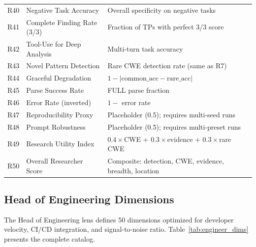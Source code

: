 \documentclass[10pt,twocolumn]{article}
\begin{document}
\begin{table}[t]
\begin{tabular}{@{}r l p{7.5cm}@{}}
R40 & Negative Task Accuracy              & Overall specificity on negative tasks \\
R41 & Complete Finding Rate (3/3)         & Fraction of TPs with perfect 3/3 score \\
R42 & Tool-Use for Deep Analysis          & Multi-turn task accuracy \\
R43 & Novel Pattern Detection             & Rare CWE detection rate (same as R7) \\
R44 & Graceful Degradation                & $1 - |\text{common\_acc} - \text{rare\_acc}|$ \\
R45 & Parse Success Rate                  & FULL parse fraction \\
R46 & Error Rate (inverted)               & $1 -$ error rate \\
R47 & Reproducibility Proxy               & Placeholder (0.5); requires multi-seed runs \\
R48 & Prompt Robustness                   & Placeholder (0.5); requires multi-preset runs \\
R49 & Research Utility Index              & $0.4{\times}$CWE + $0.3{\times}$evidence + $0.3{\times}$rare CWE \\
R50 & Overall Researcher Score            & Composite: detection, CWE, evidence, breadth, location \\
\bottomrule
\end{tabular}
\end{table}

\subsection{Head of Engineering Dimensions}
\label{sec:engineer_dims}

The Head of Engineering lens defines 50 dimensions optimized for developer velocity, CI/CD integration, and signal-to-noise ratio. Table~\ref{tab:engineer_dims} presents the complete catalog.
\end{document}
